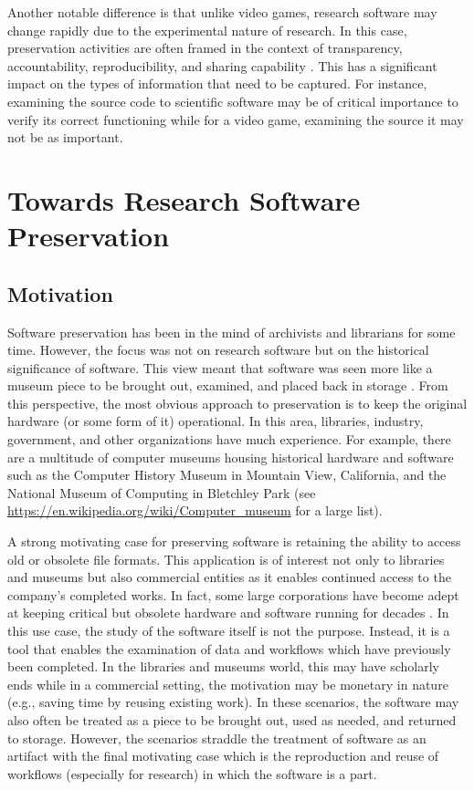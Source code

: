 \documentclass[letterpaper,11pt]{article}
\begin{document}
Another notable difference is that unlike video games, research software may change rapidly due to the experimental nature of research. In this case, preservation activities are often framed in the context of transparency, accountability, reproducibility, and sharing capability \citep{hong2010,stodden2014,lenhardt2014,bonazzi2015}. This has a significant impact on the types of information that need to be captured. For instance, examining the source code to scientific software may be of critical importance to verify its correct functioning while for a video game, examining the source it may not be as important.

\section{Towards Research Software Preservation}
\label{sec:towards-rsrch-sw-pres}
\subsection{Motivation}
\label{ssec:towards-rsrch-sw-pres:motivation}
Software preservation has been in the mind of archivists and librarians for some time. However, the focus was not on research software but on the historical significance of software.  This view meant that software was seen more like a museum piece to be brought out, examined, and placed back in storage \citep{swade1993,swade1998,zabolitzky2002}.  From this perspective, the most obvious approach to preservation is to keep the original hardware (or some form of it) operational. In this area, libraries, industry, government, and other organizations have much experience. For example, there are a multitude of computer museums housing historical hardware and software such as the Computer History Museum in Mountain View, California, and the National Museum of Computing in Bletchley Park (see \url{https://en.wikipedia.org/wiki/Computer\_museum} for a large list).

A strong motivating case for preserving software is retaining the ability to access old or obsolete file formats. This application is of interest not only to libraries and museums but also commercial entities as it enables continued access to the company's completed works. In fact, some large corporations have become adept at keeping critical but obsolete hardware and software running for decades \citep{zabolitzky2002}. In this use case, the study of the software itself is not the purpose. Instead, it is a tool that enables the examination of data and workflows which have previously been completed. In the libraries and museums world, this may have scholarly ends while in a commercial setting, the motivation may be monetary in nature (e.g., saving time by reusing existing work). In these scenarios, the software may also often be treated as a piece to be brought out, used as needed, and returned to storage. However, the scenarios straddle the treatment of software as an artifact with the final motivating case which is the reproduction and reuse of workflows (especially for research) in which the software is a part.
\end{document}
